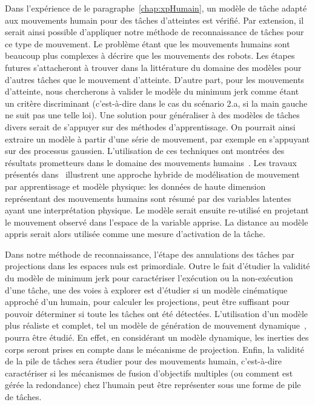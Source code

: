Dans l'expérience de le paragraphe~\ref{chap:xpHumain},
un modèle de t\^ache adapté aux mouvements humain pour des t\^aches d'atteintes est vérifié.
Par extension, il serait ainsi possible d'appliquer
notre méthode de reconnaissance de t\^aches pour ce type de mouvement.
Le problème étant que les mouvements humains sont beaucoup plus complexes à décrire
que les mouvements des robots. 
Les étapes futures s'attacheront à trouver dans la littérature du domaine
des modèles pour d'autres t\^aches que le mouvement d'atteinte. D'autre part,
pour les mouvements d'atteinte, nous chercherons à valider le modèle du minimum jerk
comme étant un critère discriminant (c'est-à-dire dans le cas du scénario 2.a,
si la main gauche ne suit pas une telle loi).
Une solution pour généraliser à des modèles de t\^aches divers serait 
de s'appuyer sur des méthodes d'apprentissage. On pourrait ainsi extraire
un modèle à partir d'une série de mouvement, par exemple en s'appuyant sur
des processus gaussien. L'utilisation de ces techniques ont montrées
des résultats prometteurs dans le domaine des mouvements humains~\cite{wang08a}.
Les travaux présentés dans~\cite{alvarez09} illustrent une approche hybride
de modélisation de mouvement par apprentissage et modèle physique:
les données de haute dimension représentant des mouvements humains
sont résumé par des variables latentes ayant une interprétation physique.
Le modèle serait ensuite re-utilisé en projetant le mouvement
observé dans l'espace de la variable apprise. La distance 
au modèle appris serait alors utilisée comme une mesure
d'activation de la t\^ache.

Dans notre méthode de reconnaissance,
l'étape des annulations des t\^aches par projections dans les espaces nuls
est primordiale. Outre le fait d'étudier la
validité du modèle de minimum jerk pour caractériser l'exécution
ou la non-exécution d'une t\^ache, une des voies à explorer est d'étudier si 
un modèle cinématique approché d'un humain, pour calculer les projections, peut être suffisant
pour pouvoir déterminer si toute les t\^aches ont été détectées.
L'utilisation d'un modèle plus réaliste et complet,
tel un modèle de génération de mouvement dynamique~\cite{saab11},
pourra être étudié. En effet, en considérant un modèle dynamique,
les inerties des corps seront prises en compte dans le mécanisme de projection.
Enfin, la validité de la pile de t\^aches
sera étudier pour des mouvements humain, c'est-à-dire caractériser si
les mécanismes de fusion d'objectifs multiples (ou comment est gérée la redondance) 
chez l'humain peut \^etre représenter sous une forme de pile de t\^aches.

